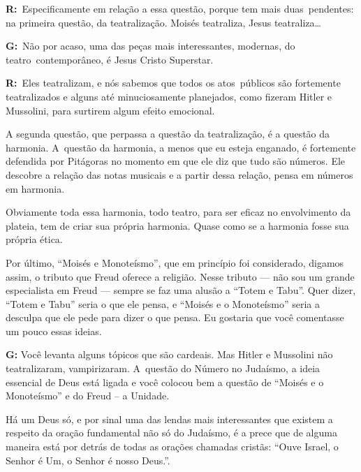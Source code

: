  

\textbf{R:}~Especificamente em relação a essa questão, porque tem mais
duas\textbf{}~pendentes: na primeira questão, da teatralização. Moisés
teatraliza, Jesus teatraliza…

 

\textbf{G:}~Não por acaso, uma das peças mais interessantes, modernas,
do teatro\textbf{}~contemporâneo, é Jesus Cristo Superstar.

 

\textbf{R:}~Eles teatralizam, e nós sabemos que todos os
atos\textbf{}~públicos são fortemente teatralizados e alguns até
minuciosamente planejados, como fizeram Hitler e Mussolini, para
surtirem algum efeito emocional.

 

A segunda questão, que perpassa a questão da teatralização, é a questão
da harmonia. A~questão da harmonia, a menos que eu esteja enganado, é
fortemente defendida por Pitágoras no momento em que ele diz que tudo
são números. Ele descobre a relação das notas musicais e a partir dessa
relação, pensa em números em harmonia.

 

Obviamente toda essa harmonia, todo teatro, para ser eficaz no
envolvimento da plateia, tem de criar sua própria harmonia. Quase como
se a harmonia fosse sua própria ética.

 

Por último, ``Moisés e Monoteísmo'', que em princípio foi considerado,
digamos assim, o tributo que Freud oferece a religião. Nesse tributo ---
não sou um grande especialista em Freud --- sempre se faz uma alusão a
``Totem e Tabu''. Quer dizer, ``Totem e Tabu'' seria o que ele pensa, e
``Moisés e o Monoteísmo'' seria a desculpa que ele pede para dizer o que
pensa. Eu gostaria que você comentasse um pouco essas ideias.

 

\textbf{G:} Você levanta alguns tópicos que são cardeais. Mas Hitler e
Mussolini não teatralizaram, vampirizaram. A~questão do Número no
Judaísmo, a ideia essencial de Deus está ligada e você colocou bem a
questão de ``Moisés e o Monoteísmo'' e do Freud -- a Unidade.

 

Há um Deus só, e por sinal uma das lendas mais interessantes que existem
a respeito da oração fundamental não só do Judaísmo, é a prece que de
alguma maneira está por detrás de todas as orações chamadas cristãs:
``Ouve Israel, o Senhor é Um, o Senhor é nosso Deus.''.

